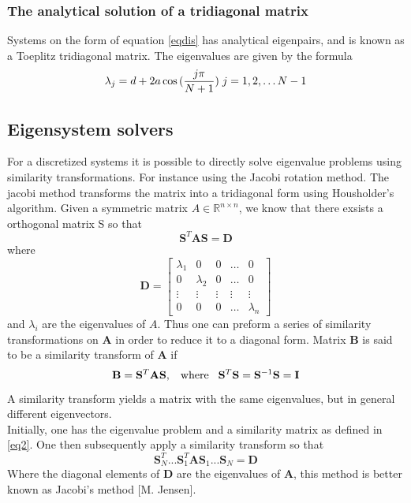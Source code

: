 \documentclass[%
reprint,
amsmath,amssymb,
aps,
]{revtex4-1}
\begin{document}
\subsubsection{The analytical solution of a tridiagonal matrix} \noindent 
Systems on the form of equation \ref{eqdis} has analytical eigenpairs, and is known as a Toeplitz tridiagonal matrix. The eigenvalues are given by the formula
\begin{equation}\label{analytical}
\lambda_j = d+2a\cos{(\frac{j\pi}{N+1})} \hspace{0.1cm} j=1,2,\dots N-1
\end{equation}


\subsection*{Eigensystem solvers} \noindent 
For a discretized systems it is possible to directly solve eigenvalue problems using similarity transformations. For instance using the Jacobi rotation method. The jacobi method transforms the matrix into a tridiagonal form using Housholder's algorithm. Given a symmetric matrix $A\in \mathbb{R}^{n\times n}$, we know that there exsists a orthogonal matrix S so that 
\begin{equation*}
	\mathbf{S}^T\mathbf{A}\mathbf{S} = \mathbf{D}
\end{equation*}
where 
\begin{equation*}
	\mathbf{D} = \begin{bmatrix}
	\lambda_1 & 0 & 0 & \dots & 0 \\
	0 & \lambda_2 & 0 & \dots & 0 \\
	\vdots & \vdots & \vdots &\vdots&\vdots\\
	0 & 0 & 0 &\dots & \lambda_n
	\end{bmatrix}
\end{equation*}
and $\lambda_i$ are the eigenvalues of $A$. Thus one can preform a series of similarity transformations on $\mathbf{A}$ in order to reduce it to a diagonal form. Matrix $\mathbf{B}$ is said to be a similarity transform of $\mathbf{A}$ if 
\begin{equation} \label{eq2}
	\mathbf{B} = \mathbf{S}^T\mathbf{A}\mathbf{S}, \hspace{3mm} \textnormal{where} \hspace{3mm} \mathbf{S}^T\mathbf{S} = \mathbf{S}^{-1}\mathbf{S} = \mathbf{I}
\end{equation}
A similarity transform yields a matrix with the same eigenvalues, but in general different eigenvectors. \\
Initially, one has the eigenvalue problem and a similarity matrix as defined in \ref{eq2}. One then subsequently apply a similarity transform so that 
\begin{equation}
	\mathbf{S}_N^T...\mathbf{S}_1^T\mathbf{A}\mathbf{S}_1...\mathbf{S}_N = \mathbf{D}
\end{equation}
Where the diagonal elements of $\mathbf{D}$ are the eigenvalues of $\mathbf{A}$, this method is better known as Jacobi's method [M. Jensen].
\end{document}

